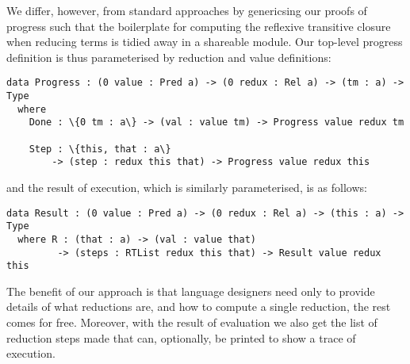 We differ, however, from standard approaches by genericsing our proofs of progress such that the boilerplate for computing the reflexive transitive closure when reducing terms is tidied away in a shareable module.
%
Our top-level progress definition is thus parameterised by reduction and value definitions:

\begin{Verbatim}
data Progress : (0 value : Pred a) -> (0 redux : Rel a) -> (tm : a) -> Type
  where
    Done : \{0 tm : a\} -> (val : value tm) -> Progress value redux tm

    Step : \{this, that : a\}
        -> (step : redux this that) -> Progress value redux this
\end{Verbatim}

\noindent
and the result of execution, which is similarly parameterised, is as follows:

\begin{Verbatim}
data Result : (0 value : Pred a) -> (0 redux : Rel a) -> (this : a) -> Type
  where R : (that : a) -> (val : value that)
         -> (steps : RTList redux this that) -> Result value redux this
\end{Verbatim}

The benefit of our approach is that language designers need only to provide details of what reductions are, and how to compute a single reduction, the rest comes for free.
%
Moreover, with the result of evaluation we also get the list of reduction steps made that can, optionally, be printed to show a trace of execution.

